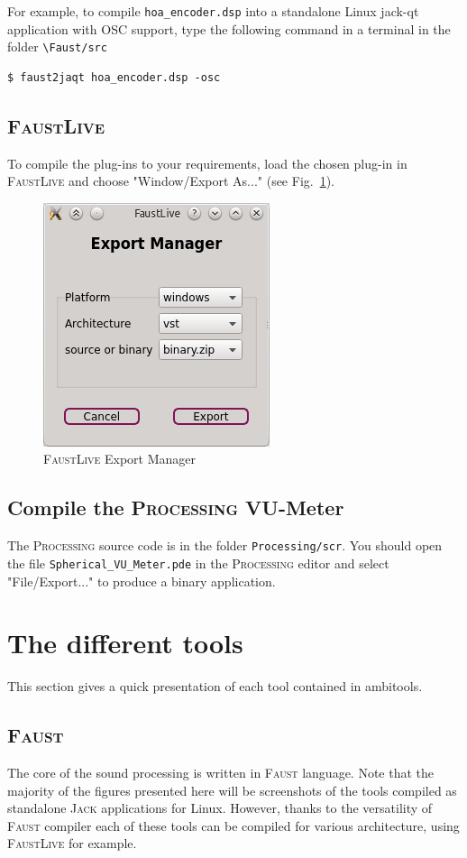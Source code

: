 \documentclass[10pt,a4paper]{article}
\begin{document}
For example, to compile \lstinline'hoa_encoder.dsp' into a standalone Linux jack-qt application with \textsc{OSC} support, type the following command in a terminal in the folder \lstinline'\Faust/src'

\begin{lstlisting}
$ faust2jaqt hoa_encoder.dsp -osc
\end{lstlisting}

\subsection{\textsc{FaustLive}}
To compile the plug-ins to your requirements, load the chosen plug-in in \textsc{FaustLive} and choose "Window/Export As..." (see Fig.~\ref{fig:faustlive}).
\begin{figure}[!ht]
\centering
\includegraphics[width=0.3\columnwidth]{faustlive_export_manager.png}
\caption{\textsc{FaustLive} Export Manager}
\label{fig:faustlive}
\end{figure}

\subsection{Compile the \textsc{Processing} VU-Meter}
The \textsc{Processing} source code is in the folder \lstinline'Processing/scr'. You should open the file \lstinline'Spherical_VU_Meter.pde' in the \textsc{Processing} editor and select "File/Export..." to produce a binary application.

\section{The different tools}
This section gives a quick presentation of each tool contained in ambitools. 
\subsection{\textsc{Faust}}
The core of the sound processing is written in \textsc{Faust} language. Note that the majority of the figures presented here will be screenshots of the tools compiled as standalone \textsc{Jack} applications for Linux. However, thanks to the versatility of \textsc{Faust} compiler each of these tools can be compiled for various architecture, using \textsc{FaustLive} for example. 
\end{document}
